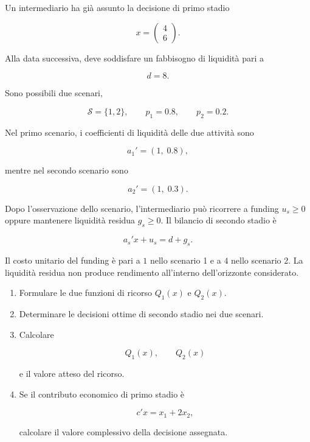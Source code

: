 \begin{exercise}

\label{ex:cap14-ricorso-assegnata}

Un intermediario ha gi\`a assunto la decisione di primo stadio

\[
x=
\begin{pmatrix}
4\\
6
\end{pmatrix}.
\]

Alla data successiva, deve soddisfare un fabbisogno di liquidit\`a pari a

\[
d=8.
\]

Sono possibili due scenari,

\[
\mathcal S=\{1,2\},
\qquad
p_1=0.8,
\qquad
p_2=0.2.
\]

Nel primo scenario, i coefficienti di liquidit\`a delle due attivit\`a sono

\[
a_1'
=
(1,\;0.8),
\]

\noindent mentre nel secondo scenario sono

\[
a_2'
=
(1,\;0.3).
\]

Dopo l'osservazione dello scenario, l'intermediario pu\`o ricorrere a funding
$u_s\geq0$ oppure mantenere liquidit\`a residua $g_s\geq0$. Il bilancio di
secondo stadio \`e

\[
a_s'x+u_s
=
d+g_s.
\]

Il costo unitario del funding \`e pari a $1$ nello scenario 1 e a $4$ nello
scenario 2. La liquidit\`a residua non produce rendimento all'interno
dell'orizzonte considerato.

\begin{enumerate}

\item Formulare le due funzioni di ricorso $Q_1(x)$ e $Q_2(x)$.

\item Determinare le decisioni ottime di secondo stadio nei due scenari.

\item Calcolare

\[
Q_1(x),
\qquad
Q_2(x)
\]

e il valore atteso del ricorso.

\item Se il contributo economico di primo stadio \`e

\[
c'x
=
x_1+2x_2,
\]

calcolare il valore complessivo della decisione assegnata.

\end{enumerate}

\end{exercise}

